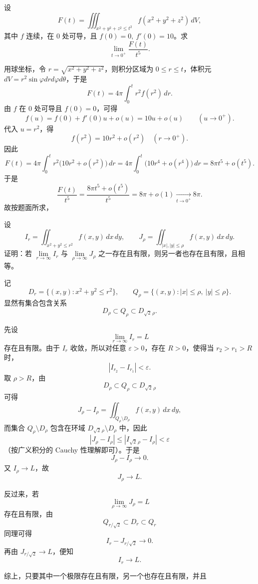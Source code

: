 \begin{question}[极限]

设
\[
F(t)=\iiint_{x^2+y^2+z^2\le t^2}f\!\left(x^2+y^2+z^2\right)\,dV,
\]
其中 $f$ 连续，在 $0$ 处可导，且 $f(0)=0,\ f'(0)=10$。求
\[
\lim_{t\to0^+}\frac{F(t)}{t^5}.
\]

\begin{solution}
用球坐标，令 $r=\sqrt{x^2+y^2+z^2}$，则积分区域为 $0\le r\le t$，体积元 $dV=r^2\sin\varphi drd\varphi d\theta$，于是
\[
F(t)=4\pi\int_0^t r^2f\!\left(r^2\right)\,dr.
\]
由 $f$ 在 $0$ 处可导且 $f(0)=0$，可得
\[
f(u)=f(0)+f'(0)u+o(u)=10u+o(u)\qquad (u\to0^+).
\]
代入 $u=r^2$，得
\[
f(r^2)=10r^2+o(r^2)\quad(r\to0^+).
\]
因此
\[
F(t)=4\pi\int_0^t r^2\bigl(10r^2+o(r^2)\bigr)\,dr
=4\pi\int_0^t\bigl(10r^4+o(r^4)\bigr)\,dr
=8\pi t^5+o(t^5).
\]
于是
\[
\frac{F(t)}{t^5}=\frac{8\pi t^5+o(t^5)}{t^5}=8\pi+o(1)\xrightarrow[t\to0^+]{}8\pi.
\]
故按题面所求，
\end{solution}
\end{question}

\begin{question}[圆域与方域的广义积分]

设
\[
I_r=\iint_{x^2+y^2\le r^2}f(x,y)\,dx\,dy,
\qquad
J_\rho=\iint_{|x|,|y|\le\rho}f(x,y)\,dx\,dy.
\]
证明：若 $\lim\limits_{r\to\infty}I_r$ 与 $\lim\limits_{\rho\to\infty}J_\rho$ 之一存在且有限，则另一者也存在且有限，且相等。

\begin{solution}
记
\[
D_r=\{(x,y):x^2+y^2\le r^2\},
\qquad
Q_\rho=\{(x,y):|x|\le\rho,\ |y|\le\rho\}.
\]
显然有集合包含关系
\[
D_\rho\subset Q_\rho\subset D_{\sqrt2\,\rho}.
\]

先设
\[
\lim_{r\to\infty}I_r=L
\]
存在且有限。由于 $I_r$ 收敛，所以对任意 $\varepsilon>0$，存在 $R>0$，使得当 $r_2>r_1>R$ 时，
\[
|I_{r_2}-I_{r_1}|<\varepsilon.
\]
取 $\rho>R$，由
\[
D_\rho\subset Q_\rho\subset D_{\sqrt2\,\rho}
\]
可得
\[
J_\rho-I_\rho=\iint_{Q_\rho\setminus D_\rho}f(x,y)\,dx\,dy,
\]
而集合 $Q_\rho\setminus D_\rho$ 包含在环域 $D_{\sqrt2\,\rho}\setminus D_\rho$ 中，因此
\[
|J_\rho-I_\rho|
\le \left|I_{\sqrt2\,\rho}-I_\rho\right|
<\varepsilon
\]
（按广义积分的 Cauchy 性理解即可）。于是
\[
J_\rho-I_\rho\to0.
\]
又 $I_\rho\to L$，故
\[
J_\rho\to L.
\]

反过来，若
\[
\lim_{\rho\to\infty}J_\rho=L
\]
存在且有限，由
\[
Q_{r/\sqrt2}\subset D_r\subset Q_r
\]
同理可得
\[
I_r-J_{r/\sqrt2}\to0.
\]
再由 $J_{r/\sqrt2}\to L$，便知
\[
I_r\to L.
\]

综上，只要其中一个极限存在且有限，另一个也存在且有限，并且
\end{solution}
\end{question}

